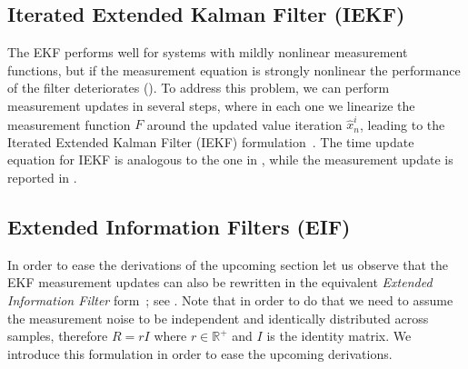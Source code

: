 % 

\subsection{Iterated Extended Kalman Filter (IEKF)}
\label{app:iekf}
The EKF performs well for systems with mildly nonlinear measurement functions, but if the measurement equation is strongly nonlinear the performance of the filter deteriorates (\cite{havlik2015performance}).
To address this problem, we can perform measurement updates in several steps, where in each one we linearize the measurement function $F$ around the updated value iteration $\hat{x}_n^i$, leading to the Iterated Extended Kalman Filter (IEKF) formulation~\cite{havlik2015performance}. The time update equation for IEKF is analogous to the one in , while the measurement update is reported in .




\subsection{Extended Information Filters (EIF)}
\label{app:eif}
In order to ease the derivations of the upcoming section let us observe that the EKF measurement updates can also be rewritten in the equivalent \emph{Extended Information Filter} form~\cite{optimal}; see . Note that in order to do that we need to assume the measurement noise to be independent and identically distributed across samples, therefore $R=rI$ where $r\in \mathbb{R}^+$ and $I$ is the identity matrix. We introduce this formulation in order to ease the upcoming derivations. 


